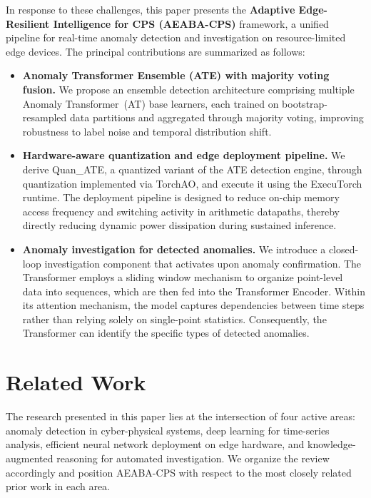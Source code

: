 \documentclass[pdflatex,sn-mathphys-num]{sn-jnl}
\theoremstyle{thmstyleone}
\theoremstyle{thmstyletwo}
\theoremstyle{thmstylethree}
\begin{document}
In response to these challenges, this paper presents the \textbf{Adaptive Edge-Resilient Intelligence for CPS (AEABA-CPS)} framework, a unified pipeline for real-time anomaly detection and investigation on resource-limited edge devices. The principal contributions are summarized as follows:
\begin{itemize}
    \item \textbf{Anomaly Transformer Ensemble (ATE) with majority voting fusion.} We propose an ensemble detection architecture comprising multiple Anomaly Transformer~(AT) base learners, each trained on bootstrap-resampled data partitions and aggregated through majority voting, improving robustness to label noise and temporal distribution shift.
    \item \textbf{Hardware-aware quantization and edge deployment pipeline.} We derive Quan\_ATE, a quantized variant of the ATE detection engine, through quantization implemented via TorchAO, and execute it using the ExecuTorch runtime. The deployment pipeline is designed to reduce on-chip memory access frequency and switching activity in arithmetic datapaths, thereby directly reducing dynamic power dissipation during sustained inference.
    \item \textbf{Anomaly investigation for detected anomalies.} We introduce a closed-loop investigation component that activates upon anomaly confirmation. The Transformer employs a sliding window mechanism to organize point-level data into sequences, which are then fed into the Transformer Encoder. Within its attention mechanism, the model captures dependencies between time steps rather than relying solely on single-point statistics. Consequently, the Transformer can identify the specific types of detected anomalies.
\end{itemize}

\section{Related Work}\label{sec: related}
The research presented in this paper lies at the intersection of four active areas: anomaly detection in cyber-physical systems, deep learning for time-series analysis, efficient neural network deployment on edge hardware, and knowledge-augmented reasoning for automated investigation. We organize the review accordingly and position AEABA-CPS with respect to the most closely related prior work in each area.
\end{document}
